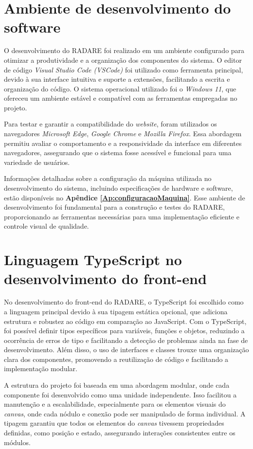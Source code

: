 \section{Ambiente de desenvolvimento do software}

O desenvolvimento do RADARE foi realizado em um ambiente configurado para otimizar a produtividade e a organização dos componentes do sistema. O editor de código \textit{Visual Studio Code (VSCode)} foi utilizado como ferramenta principal, devido à sua interface intuitiva e suporte a extensões, facilitando a escrita e organização do código. O sistema operacional utilizado foi o \textit{Windows 11}, que ofereceu um ambiente estável e compatível com as ferramentas empregadas no projeto.

Para testar e garantir a compatibilidade do \textit{website}, foram utilizados os navegadores \textit{Microsoft Edge}, \textit{Google Chrome} e \textit{Mozilla Firefox}. Essa abordagem permitiu avaliar o comportamento e a responsividade da interface em diferentes navegadores, assegurando que o sistema fosse acessível e funcional para uma variedade de usuários.

Informações detalhadas sobre a configuração da máquina utilizada no desenvolvimento do sistema, incluindo especificações de hardware e software, estão disponíveis no \textbf{Apêndice \ref{Ap:configuracaoMaquina}}. Esse ambiente de desenvolvimento foi fundamental para a construção e testes do RADARE, proporcionando as ferramentas necessárias para uma implementação eficiente e controle visual de qualidade.

    
\section{Linguagem TypeScript no desenvolvimento do front-end}

No desenvolvimento do front-end do RADARE, o TypeScript foi escolhido como a linguagem principal devido à sua tipagem estática opcional, que adiciona estrutura e robustez ao código em comparação ao JavaScript. Com o TypeScript, foi possível definir tipos específicos para variáveis, funções e objetos, reduzindo a ocorrência de erros de tipo e facilitando a detecção de problemas ainda na fase de desenvolvimento. Além disso, o uso de interfaces e classes trouxe uma organização clara dos componentes, promovendo a reutilização de código e facilitando a implementação modular.

A estrutura do projeto foi baseada em uma abordagem modular, onde cada componente foi desenvolvido como uma unidade independente. Isso facilitou a manutenção e a escalabilidade, especialmente para os elementos visuais do \textit{canvas}, onde cada nódulo e conexão pode ser manipulado de forma individual. A tipagem garantiu que todos os elementos do \textit{canvas} tivessem propriedades definidas, como posição e estado, assegurando interações consistentes entre os módulos.

